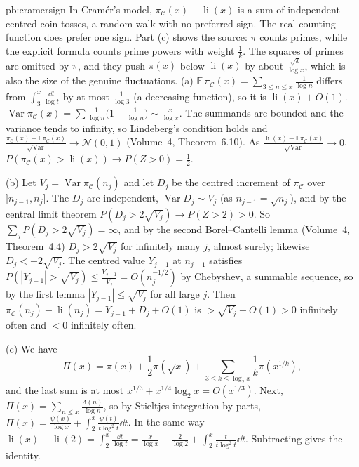 \begin{solution}{pb:cramersign}
\idea In Cram\'er's model, $\pi_{\mathcal C}(x)-\operatorname{li}(x)$ is a sum of independent centred coin tosses, a random walk with no preferred sign. The real counting function does prefer one sign. Part (c) shows the source: $\pi$ counts primes, while the explicit formula counts prime powers with weight $\frac1k$. The squares of primes are omitted by $\pi$, and they push $\pi(x)$ below $\operatorname{li}(x)$ by about $\frac{\sqrt x}{\log x}$, which is also the size of the genuine fluctuations.
\writeup (a) $\mathbb E\,\pi_{\mathcal C}(x)=\sum_{3\le n\le x}\frac1{\log n}$ differs from $\int_3^x\frac{\dd t}{\log t}$ by at most $\frac1{\log3}$ (a decreasing function), so it is
$\operatorname{li}(x)+O(1)$. $\operatorname{Var}\pi_{\mathcal C}(x)=\sum\frac1{\log n}\bigl(1-\frac1{\log n}\bigr)\sim\frac x{\log x}$. The summands are bounded and the variance tends to infinity, so
Lindeberg's condition holds and $\frac{\pi_{\mathcal C}(x)-\mathbb E\pi_{\mathcal C}(x)}{\sqrt{\operatorname{Var}}}\to\mathcal N(0,1)$ (Volume~4, Theorem~6.10). As
$\frac{\operatorname{li}(x)-\mathbb E\pi_{\mathcal C}(x)}{\sqrt{\operatorname{Var}}}\to0$, $P(\pi_{\mathcal C}(x)>\operatorname{li}(x))\to P(Z>0)=\frac12$.

(b) Let $V_j=\operatorname{Var}\pi_{\mathcal C}(n_j)$ and let $D_j$ be the centred increment of $\pi_{\mathcal C}$ over $]n_{j-1},n_j]$. The $D_j$ are independent, $\operatorname{Var}D_j\sim V_j$ (as
$n_{j-1}=\sqrt{n_j}$), and by the central limit theorem $P(D_j>2\sqrt{V_j})\to P(Z>2)>0$. So $\sum_jP(D_j>2\sqrt{V_j})=\infty$, and by the second Borel--Cantelli lemma (Volume~4,
Theorem~4.4) $D_j>2\sqrt{V_j}$ for infinitely many $j$, almost surely; likewise $D_j<-2\sqrt{V_j}$. The centred value $Y_{j-1}$ at $n_{j-1}$ satisfies
$P(|Y_{j-1}|>\sqrt{V_j})\le\frac{V_{j-1}}{V_j}=O(n_j^{-1/2})$ by Chebyshev, a summable sequence, so by the first lemma $|Y_{j-1}|\le\sqrt{V_j}$ for all large $j$. Then
$\pi_{\mathcal C}(n_j)-\operatorname{li}(n_j)=Y_{j-1}+D_j+O(1)$ is $>\sqrt{V_j}-O(1)>0$ infinitely often and $<0$ infinitely often.

(c) We have
\[
\Pi(x)=\pi(x)+\frac12\pi(\sqrt x)+\sum_{3\le k\le\log_2x}\frac1k\pi(x^{1/k}),
\]
and the last sum is at most $x^{1/3}+x^{1/4}\log_2x=O(x^{1/3})$. Next, $\Pi(x)=\sum_{n\le x}\frac{\Lambda(n)}{\log n}$,
so by Stieltjes integration by parts, $\Pi(x)=\frac{\psi(x)}{\log x}+\int_2^x\frac{\psi(t)}{t\log^2t}\dd t$. In the same way
$\operatorname{li}(x)-\operatorname{li}(2)=\int_2^x\frac{\dd t}{\log t}=\frac x{\log x}-\frac2{\log2}+\int_2^x\frac{t}{t\log^2t}\dd t$. Subtracting gives the identity.


\end{solution}
